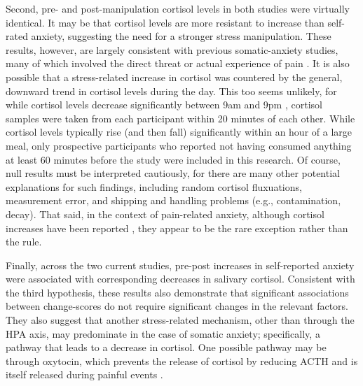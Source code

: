 \documentclass[review]{elsarticle}\usepackage[]{graphicx}\usepackage[]{color}
\begin{document}
Second, pre- and post-manipulation cortisol levels in both studies were virtually identical.
It may be that cortisol levels are more resistant to increase than self-rated anxiety, suggesting the need for a stronger stress manipulation.
These results, however, are largely consistent with previous somatic-anxiety studies, many of which involved the direct threat or actual experience of pain \cite{king2010anxiety,ashman2002stress,battaglia1997physiological,quas2004physiological}.
It is also possible that a stress-related increase in cortisol was countered by the general, downward trend in cortisol levels during the day.
This too seems unlikely, for while cortisol levels decrease significantly between 9am and 9pm \cite{legler1982diurnal}, cortisol samples were taken from each participant within 20 minutes of each other. While cortisol levels typically rise (and then fall) significantly within an hour of a large meal, only prospective participants who reported not having consumed anything at least 60 minutes before the study were included in this research.
Of course, null results must be interpreted cautiously, for there are many other potential explanations for such findings, including random cortisol fluxuations, measurement error, and shipping and handling problems (e.g., contamination, decay).
That said, in the context of pain-related anxiety, although cortisol increases have been reported \cite{alpers2003salivary}, they appear to be the rare exception rather than the rule.

Finally, across the two current studies, pre-post increases in self-reported anxiety were associated with corresponding decreases in salivary cortisol.
Consistent with the third hypothesis, these results also demonstrate that significant associations between change-scores do not require significant changes in the relevant factors.
They also suggest that another stress-related mechanism, other than through the HPA axis, may predominate in the case of somatic anxiety; specifically, a pathway that leads to a decrease in cortisol.
One possible pathway may be through oxytocin, which prevents the release of cortisol by reducing ACTH and is itself released during painful events \cite{tops2007anxiety,neumann1999brain,gibbs1986oxytocin}.
\end{document}
